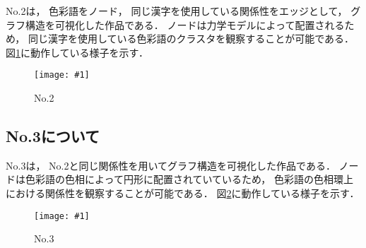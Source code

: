 \documentclass[a4j,twocolumn]{ujarticle} %
\newcommand{\workname}{緋色の習作}
\newcommand{\colorname}{色彩語}
\newcommand{\colorkanji}{色彩漢字}
\newcommand{\recallcolor}{色イメージ}
\newcommand{\mysubsection}[1]{\vspace{-12pt}\subsection{#1}}
\newcommand{\myfigure}[3]{
\begin{figure}[htbp]
  \begin{center}
    \texttt{[image: \#1]}
    \caption{#2}
    \label{#3}
  \end{center}
\end{figure}
\vspace{-3zh}
}
\begin{document}
No.2は，
\colorname{}をノード，
同じ漢字を使用している関係性をエッジとして，
グラフ構造を可視化した作品である．
ノードは力学モデルによって配置されるため，
同じ漢字を使用している\colorname{}のクラスタを観察することが可能である．
図\ref{no2}に動作している様子を示す．

\myfigure{fig/kanji-color-graph.eps}{No.2}{no2}

\mysubsection{No.3について}

No.3は，
No.2と同じ関係性を用いてグラフ構造を可視化した作品である．
ノードは\colorname{}の色相によって円形に配置されていているため，
\colorname{}の色相環上における関係性を観察することが可能である．
図\ref{no3}に動作している様子を示す．

\myfigure{fig/kanji-circle-color-graph.eps}{No.3}{no3}

% 
% 
% 



\end{document}
